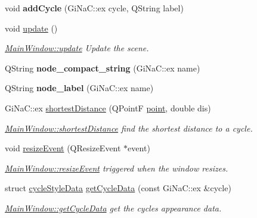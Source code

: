 \begin{DoxyCompactItemize}
void {\bfseries add\+Cycle} (Gi\+Na\+C\+::ex cycle, Q\+String label)
\item 
void \mbox{\hyperlink{class_main_window_a128f71880d4b9683149023fc46fcc9f8}{update}} ()
\begin{DoxyCompactList}\small\item\em \mbox{\hyperlink{class_main_window_a128f71880d4b9683149023fc46fcc9f8}{Main\+Window\+::update}} Update the scene. \end{DoxyCompactList}\item 
\mbox{\label{class_main_window_a824f237890279ea706b827422f47ae4a}} 
Q\+String {\bfseries node\+\_\+compact\+\_\+string} (Gi\+Na\+C\+::ex name)
\item 
\mbox{\label{class_main_window_a989b1d1dcf93a3441027f4cd49bf28a5}} 
Q\+String {\bfseries node\+\_\+label} (Gi\+Na\+C\+::ex name)
\item 
Gi\+Na\+C\+::ex \mbox{\hyperlink{class_main_window_a2431b3144405d8d0d3e8bd3523ad381b}{shortest\+Distance}} (Q\+PointF \mbox{\hyperlink{classpoint}{point}}, double dis)
\begin{DoxyCompactList}\small\item\em \mbox{\hyperlink{class_main_window_a2431b3144405d8d0d3e8bd3523ad381b}{Main\+Window\+::shortest\+Distance}} find the shortest distance to a cycle. \end{DoxyCompactList}\item 
void \mbox{\hyperlink{class_main_window_ae12f8f63791595567b6250f8bb002bda}{resize\+Event}} (Q\+Resize\+Event $\ast$event)
\begin{DoxyCompactList}\small\item\em \mbox{\hyperlink{class_main_window_ae12f8f63791595567b6250f8bb002bda}{Main\+Window\+::resize\+Event}} triggered when the window resizes. \end{DoxyCompactList}\item 
struct \mbox{\hyperlink{structcycle_style_data}{cycle\+Style\+Data}} \mbox{\hyperlink{class_main_window_a3088b7addf938e91e77b741a9ae22a53}{get\+Cycle\+Data}} (const Gi\+Na\+C\+::ex \&cycle)
\begin{DoxyCompactList}\small\item\em \mbox{\hyperlink{class_main_window_a3088b7addf938e91e77b741a9ae22a53}{Main\+Window\+::get\+Cycle\+Data}} get the cycles appearance data. \end{DoxyCompactList}\item 

\end{DoxyCompactItemize}
